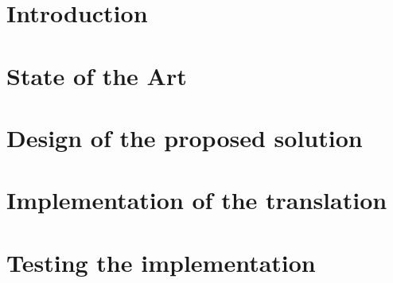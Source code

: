 \documentclass[12pt, oneside]{book}
\begin{document}




\chapter{Introduction}









\chapter{State of the Art}







\chapter{Design of the proposed solution}







\chapter{Implementation of the translation}










\chapter{Testing the implementation}





\end{document}
